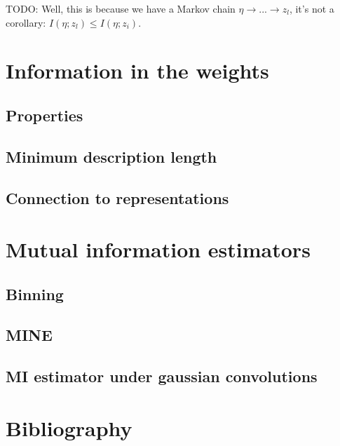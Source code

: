\documentclass{article}
\begin{document}
TODO:
Well, this is because we have a Markov chain $\eta \to ... \to z_l$, it's not a corollary:
$I(\eta; z_l) \leq I(\eta; z_i)$.

\section{Information in the weights}
\subsection{Properties}
\subsection{Minimum description length}
\subsection{Connection to representations}

\section{Mutual information estimators}
\subsection{Binning}

\subsection{MINE}

\subsection{MI estimator under gaussian convolutions}

\section{Bibliography}
\printbibliography
\end{document}
